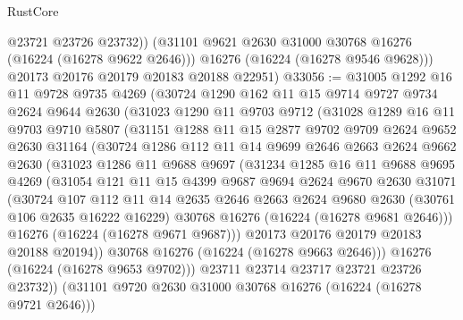 \begin{lexlean}{RustCore}
\begin{coremodule}
            @23721
            @23726
            @23732))
        (@31101 @9621 @2630 @31000 @30768 @16276 (@16224 (@16278 @9622 @2646)))
        @16276
        (@16224 (@16278 @9546 @9628)))
      @20173
      @20176
      @20179
      @20183
      @20188
      @22951)
@33056 := @31005
    @1292
    @16
    @11
    @9728
    @9735
    @4269
    (@30724
      @1290
      @162
      @11
      @15
      @9714
      @9727
      @9734
      @2624
      @9644
      @2630
      (@31023
        @1290
        @11
        @9703
        @9712
        (@31028
          @1289
          @16
          @11
          @9703
          @9710
          @5807
          (@31151
            @1288
            @11
            @15
            @2877
            @9702
            @9709
            @2624
            @9652
            @2630
            @31164
            (@30724
              @1286
              @112
              @11
              @14
              @9699
              @2646
              @2663
              @2624
              @9662
              @2630
              (@31023
                @1286
                @11
                @9688
                @9697
                (@31234
                  @1285
                  @16
                  @11
                  @9688
                  @9695
                  @4269
                  (@31054
                    @121
                    @11
                    @15
                    @4399
                    @9687
                    @9694
                    @2624
                    @9670
                    @2630
                    @31071
                    (@30724
                      @107
                      @112
                      @11
                      @14
                      @2635
                      @2646
                      @2663
                      @2624
                      @9680
                      @2630
                      (@30761 @106 @2635 @16222 @16229)
                      @30768
                      @16276
                      (@16224 (@16278 @9681 @2646)))
                    @16276
                    (@16224 (@16278 @9671 @9687)))
                  @20173
                  @20176
                  @20179
                  @20183
                  @20188
                  @20194))
              @30768
              @16276
              (@16224 (@16278 @9663 @2646)))
            @16276
            (@16224 (@16278 @9653 @9702)))
          @23711
          @23714
          @23717
          @23721
          @23726
          @23732))
      (@31101 @9720 @2630 @31000 @30768 @16276 (@16224 (@16278 @9721 @2646)))

\end{coremodule}
\end{lexlean}
